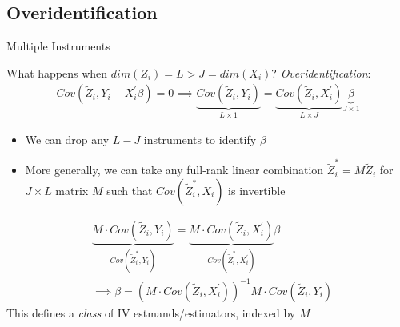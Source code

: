 \documentclass{beamer}
\begin{document}
\subsection{Overidentification}

\begin{frame}{Multiple Instruments}

What happens when $dim(Z_i)=L>J=dim(X_i)$? \emph{Overidentification}:
\vspace{-0.2cm}
\begin{align*}
Cov(\tilde{Z}_i,Y_i-X_i^\prime\beta)=0 \implies \underbrace{Cov(\tilde{Z}_i,Y_i)}_{L\times 1}=\underbrace{Cov(\tilde{Z}_i,X_i^\prime)}_{L\times J}\underbrace{\beta}_{J\times 1}
\end{align*}
\vspace{-0.5cm}
\begin{itemize}
\item We can drop any $L-J$ instruments to identify $\beta$\pause{}
\item More generally, we can take any full-rank linear combination $\tilde{Z}_i^*=M\tilde{Z}_i$ for $J\times L$ matrix $M$ such that $Cov(\tilde{Z}_i^*,X_i)$ is invertible
\end{itemize}
\vspace{-0.3cm}
\begin{align*}
&\underbrace{M\cdot Cov (\tilde{Z}_i,Y_i)}_{Cov(\tilde{Z}_i^*,Y_i)}=\underbrace{M\cdot Cov(\tilde{Z}_i,X_i^\prime)}_{Cov(\tilde{Z}_i^*,X_i^\prime)}\beta\\
&\implies \beta = \left(M\cdot Cov(\tilde{Z}_i,X_i^\prime)\right)^{-1} M\cdot Cov(\tilde{Z}_i,Y_i)
\end{align*}\pause{}
This defines a \emph{class} of IV estmands/estimators, indexed by $M$
\end{frame}
\end{document}
